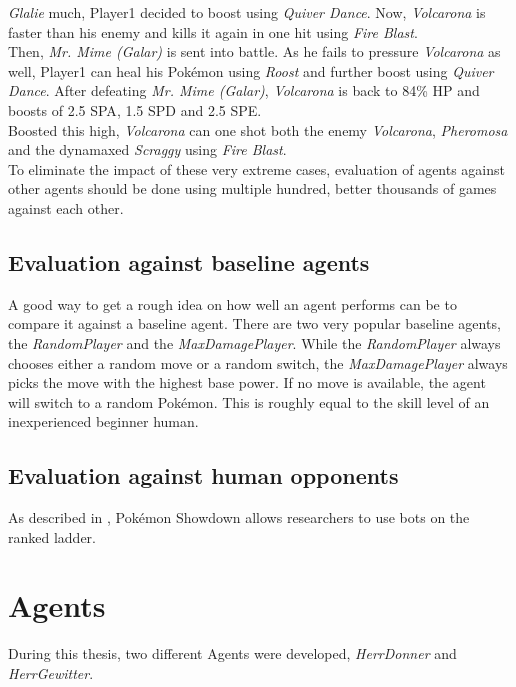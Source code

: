 \textit{Glalie} much, Player1 decided to boost using \textit{Quiver Dance}. Now, \textit{Volcarona}
is faster than his enemy and kills it again in one hit using \textit{Fire Blast}. \\
Then, \textit{Mr. Mime (Galar)} is sent into battle. As he fails to pressure \textit{Volcarona} as well,
Player1 can heal his Pokémon using \textit{Roost} and further boost using \textit{Quiver Dance}. After
defeating \textit{Mr. Mime (Galar)}, \textit{Volcarona} is back to 84\% HP and boosts of 2.5 \ac{SPA},
1.5 \ac{SPD} and 2.5 \ac{SPE}. \\
Boosted this high, \textit{Volcarona} can one shot both the enemy \textit{Volcarona},
\textit{Pheromosa} and the dynamaxed \textit{Scraggy} using \textit{Fire Blast}. \\
To eliminate the impact of these very extreme cases, evaluation of agents against other agents 
should be done using multiple hundred, better thousands of games against each other.

\subsection{Evaluation against baseline agents}
\label{sec:eval-challenges-baseline}
A good way to get a rough idea on how well an agent performs can be to compare it against a baseline agent.
There are two very popular baseline agents, the \textit{RandomPlayer} and the \textit{MaxDamagePlayer}.
While the \textit{RandomPlayer} always chooses either a random move or a random switch, the \textit{MaxDamagePlayer}
always picks the move with the highest base power. If no move is available, the agent will switch to a random 
Pokémon. This is roughly equal to the skill level of an inexperienced beginner human. 

\subsection{Evaluation against human opponents}
As described in , Pokémon Showdown allows researchers to use bots on the
ranked ladder. 

\section{Agents}
During this thesis, two different Agents were developed, \textit{HerrDonner} and \textit{HerrGewitter}.

